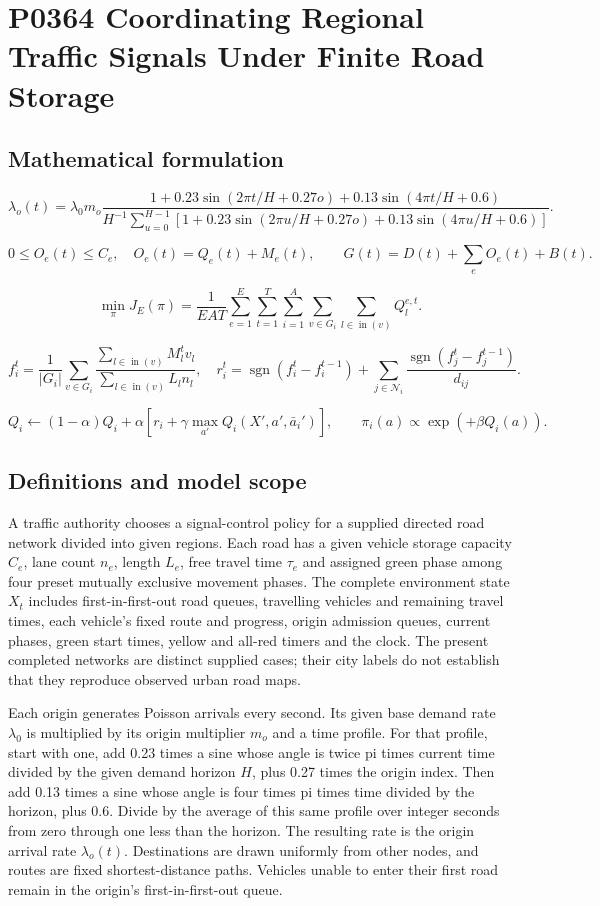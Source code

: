 \documentclass[10pt]{article}
\begin{document}
\section*{P0364 Coordinating Regional Traffic Signals Under Finite Road Storage}
\subsection*{Mathematical formulation}
\[
\lambda_o(t)=\lambda_0m_o
\frac{1+0.23\sin(2\pi t/H+0.27o)+0.13\sin(4\pi t/H+0.6)}
{H^{-1}\sum_{u=0}^{H-1}[1+0.23\sin(2\pi u/H+0.27o)+0.13\sin(4\pi u/H+0.6)]}.
\]

\[
0\le O_e(t)\le C_e,\quad O_e(t)=Q_e(t)+M_e(t),\qquad
G(t)=D(t)+\sum_eO_e(t)+B(t).
\]

\[
\min_\pi J_E(\pi)=\frac1{EAT}\sum_{e=1}^E\sum_{t=1}^T
\sum_{i=1}^A\sum_{v\in G_i}\sum_{l\in\operatorname{in}(v)}Q_l^{e,t}.
\]

\[
f_i^t=\frac1{|G_i|}\sum_{v\in G_i}
\frac{\sum_{l\in\operatorname{in}(v)}M_l^t v_l}{\sum_{l\in\operatorname{in}(v)}L_ln_l},
\quad r_i^t=\operatorname{sgn}(f_i^t-f_i^{t-1})
+\sum_{j\in\mathcal N_i}\frac{\operatorname{sgn}(f_j^t-f_j^{t-1})}{d_{ij}}.
\]

\[
Q_i\leftarrow(1-\alpha)Q_i+\alpha
\left[r_i+\gamma\max_{a'}Q_i(X',a',\bar a_i')\right],\qquad
\pi_i(a)\propto\exp(+\beta Q_i(a)).
\]

\subsection*{Definitions and model scope}
A traffic authority chooses a signal-control policy for a supplied directed road network divided into given regions. Each road has a given vehicle storage capacity $C_e$, lane count $n_e$, length $L_e$, free travel time $\tau_e$ and assigned green phase among four preset mutually exclusive movement phases. The complete environment state $X_t$ includes first-in-first-out road queues, travelling vehicles and remaining travel times, each vehicle's fixed route and progress, origin admission queues, current phases, green start times, yellow and all-red timers and the clock. The present completed networks are distinct supplied cases; their city labels do not establish that they reproduce observed urban road maps.

Each origin generates Poisson arrivals every second. Its given base demand rate $\lambda_0$ is multiplied by its origin multiplier $m_o$ and a time profile. For that profile, start with one, add 0.23 times a sine whose angle is twice pi times current time divided by the given demand horizon $H$, plus 0.27 times the origin index. Then add 0.13 times a sine whose angle is four times pi times time divided by the horizon, plus 0.6. Divide by the average of this same profile over integer seconds from zero through one less than the horizon. The resulting rate is the origin arrival rate $\lambda_o(t)$. Destinations are drawn uniformly from other nodes, and routes are fixed shortest-distance paths. Vehicles unable to enter their first road remain in the origin's first-in-first-out queue.
\end{document}
